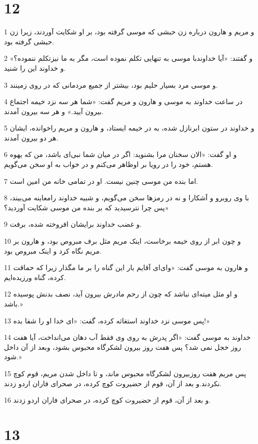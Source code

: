 \chapter{12}

\par 1 و مریم و هارون درباره زن حبشی که موسی گرفته بود، بر او شکایت آوردند، زیرا زن حبشی گرفته بود.
\par 2 و گفتند: «آیا خداوندبا موسی به تنهایی تکلم نموده است، مگر به ما نیزتکلم ننموده؟» و خداوند این را شنید.
\par 3 و موسی مرد بسیار حلیم بود، بیشتر از جمیع مردمانی که در روی زمینند.
\par 4 در ساعت خداوند به موسی و هارون و مریم گفت: «شما هر سه نزد خیمه اجتماع بیرون آیید.» و هر سه بیرون آمدند.
\par 5 و خداوند در ستون ابرنازل شده، به در خیمه ایستاد، و هارون و مریم راخوانده، ایشان هر دو بیرون آمدند.
\par 6 و او گفت: «الان سخنان مرا بشنوید: اگر در میان شما نبی‌ای باشد، من که یهوه هستم، خود را در رویا بر اوظاهر می‌کنم و در خواب به او سخن می‌گویم.
\par 7 اما بنده من موسی چنین نیست. او در تمامی خانه من امین است.
\par 8 با وی روبرو و آشکارا و نه در رمزها سخن می‌گویم، و شبیه خداوند رامعاینه می‌بیند، پس چرا نترسیدید که بر بنده من موسی شکایت آوردید؟»
\par 9 و غضب خداوند برایشان افروخته شده، برفت.
\par 10 و چون ابر از روی خیمه برخاست، اینک مریم مثل برف مبروص بود، و هارون بر مریم نگاه کرد و اینک مبروص بود.
\par 11 و هارون به موسی گفت: «وای‌ای آقایم بار این گناه را بر ما مگذار زیرا که حماقت کرده، گناه ورزیده‌ایم.
\par 12 و او مثل میته‌ای نباشد که چون از رحم مادرش بیرون آید، نصف بدنش پوسیده باشد.»
\par 13 پس موسی نزد خداوند استغاثه کرده، گفت: «ای خدا او را شفا بده!»
\par 14 خداوند به موسی گفت: «اگر پدرش به روی وی فقط آب دهان می‌انداخت، آیا هفت روز خجل نمی شد؟ پس هفت روز بیرون لشکرگاه محبوس بشود، وبعد از آن داخل شود.»
\par 15 پس مریم هفت روزبیرون لشکرگاه محبوس ماند، و تا داخل شدن مریم، قوم کوچ نکردند.و بعد از آن، قوم از حضیروت کوچ کرده، در صحرای فاران اردو زدند.
\par 16 و بعد از آن، قوم از حضیروت کوچ کرده، در صحرای فاران اردو زدند.
 
\chapter{13}

